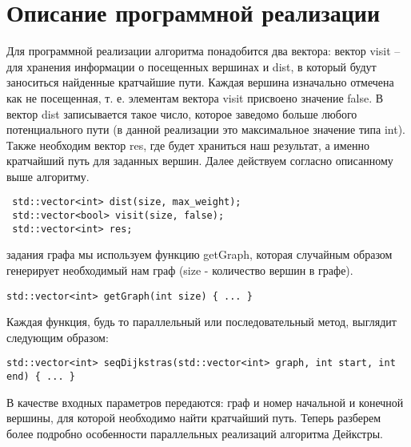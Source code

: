 \documentclass{report}
\begin{document}
\section*{Описание программной реализации}
Для программной реализации алгоритма понадобится два вектора: вектор visit – для хранения информации о посещенных вершинах и dist, в который будут заноситься найденные кратчайшие пути. Каждая вершина изначально отмечена как не посещенная, т. е. элементам вектора visit присвоено значение false. В вектор dist записывается такое число, которое заведомо больше любого потенциального пути (в данной реализации это максимальное значение типа int). Также необходим вектор res, где будет храниться наш результат, а именно кратчайший путь для заданных вершин. Далее действуем согласно описанному выше алгоритму.
\begin{lstlisting}
 std::vector<int> dist(size, max_weight);
 std::vector<bool> visit(size, false);
 std::vector<int> res;
\end{lstlisting}
 задания графа мы используем функцию getGraph, которая случайным образом генерирует необходимый нам граф (size - количество вершин в графе).
\begin{lstlisting}
std::vector<int> getGraph(int size) { ... }
\end{lstlisting}
\par Каждая функция, будь то параллельный или последовательный метод, выглядит следующим образом:
\begin{lstlisting}
std::vector<int> seqDijkstras(std::vector<int> graph, int start, int end) { ... }
\end{lstlisting}
\par В качестве входных параметров передаются: граф и номер начальной и конечной вершины, для которой необходимо найти кратчайший путь. Теперь разберем более подробно особенности параллельных реализаций алгоритма Дейкстры. 
\end{document}

